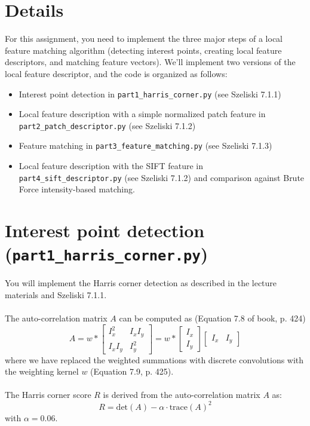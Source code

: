 \documentclass{article}
\begin{document}
\section*{Details}
For this assignment, you need to implement the three major steps of a local feature matching algorithm (detecting interest points, creating local feature descriptors, and matching feature vectors). We'll implement two versions of the local feature descriptor, and the code is organized as follows:
\begin{itemize}
    \item{Interest point detection in \lstinline{part1_harris_corner.py} (see Szeliski 7.1.1)}
    \item{Local feature description with a simple normalized patch feature in \lstinline{part2_patch_descriptor.py} (see Szeliski 7.1.2)}
    \item{Feature matching in \lstinline{part3_feature_matching.py} (see Szeliski 7.1.3)}
    \item{Local feature description with the SIFT feature in \lstinline{part4_sift_descriptor.py} (see Szeliski 7.1.2) and comparison against Brute Force intensity-based matching.}
\end{itemize}

\section{Interest point detection (\lstinline{part1_harris_corner.py})}
You will implement the Harris corner detection as described in the lecture materials and Szeliski 7.1.1. 
\\
\\
The auto-correlation matrix $A$ can be computed as (Equation 7.8 of book, p. 424)
\begin{equation}
    A = w * \begin{bmatrix}
    I_x^2 & I_x I_y \\
    I_x I_y & I_y^2
    \end{bmatrix} = w * \begin{bmatrix}
    I_x \\ I_y 
    \end{bmatrix} \begin{bmatrix}
    I_x & I_y
    \end{bmatrix}
\end{equation}
where we have replaced the weighted summations with discrete convolutions with the weighting kernel $w$ (Equation 7.9, p. 425).
\\
\\
The Harris corner score $R$ is derived from the auto-correlation matrix $A$ as:
\begin{equation}
   R = \mbox{det}(A) - \alpha \cdot \mbox{trace}(A)^2 
\label{eqn:harris-corner-measure}
\end{equation}
with $\alpha=0.06$.
\end{document}
